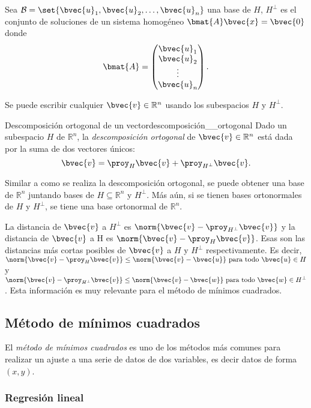 \documentclass{fmbnotes}
\begin{document}
Sea \(\mathcal{B}=\set{\bvec{u}_1,\bvec{u}_2,\ldots,\bvec{u}_n}\) una base de \(H\), \(H^\perp\) es el conjunto de soluciones de un sistema homogéneo \(\bmat{A}\bvec{x}=\bvec{0}\) donde \[\bmat{A}=\begin{pmatrix}
\bvec{u}_1 \\ \bvec{u}_2 \\ \vdots \\ \bvec{u}_n
\end{pmatrix}.\]

Se puede escribir cualquier \(\bvec{v}\in\mathbb{R}^{n}\) usando los subespacios \(H\) y \(H^\perp\).
\begin{teorema}{Descomposición ortogonal de un vector}{descomposición__ortogonal}
	Dado un subespacio \(H\) de \(\mathbb{R}^{n}\), la \emph{descomposición ortogonal} de \(\bvec{v}\in\mathbb{R}^{n}\) está dada por la suma de dos vectores únicos:
	\[\bvec{v}=\proy_H\bvec{v}+\proy_{H^\perp}\bvec{v}.\]
\end{teorema}

Similar a como se realiza la descomposición ortogonal, se puede obtener una base de \(\mathbb{R}^{n}\) juntando bases de \(H\subseteq\mathbb{R}^{n}\)
 y \(H^\perp\). Más aún, si se tienen bases ortonormales de \(H\) y \(H^\perp\), se tiene una base ortonormal de \(\mathbb{R}^{n}\).
 
La distancia de \( \bvec{v} \) a \( H^\perp \) es \( \norm{\bvec{v}-\proy_{H^\perp}\bvec{v}} \) y la distancia de \( \bvec{v} \) a H es \( \norm{\bvec{v}-\proy_{H}\bvec{v}} \). Esas son las distancias más cortas posibles de \(\bvec{v}\) a \(H\) y \(H^\perp\) respectivamente. Es decir, \( \norm{\bvec{v}-\proy_{H}\bvec{v}} \leq \norm{\bvec{v}-\bvec{u}} \text{ para todo } \bvec{u} \in H\) y \( \norm{\bvec{v}-\proy_{H^\perp}\bvec{v}}\leq \norm{\bvec{v}-\bvec{w}} \text{ para todo } \bvec{w} \in H^\perp \). Esta información es muy relevante para el método de mínimos cuadrados.

\subsection{Método de mínimos cuadrados}

El \emph{método de mínimos cuadrados} es uno de los métodos más comunes para realizar un ajuste a una serie de datos de dos variables, es decir datos de forma \((x,y)\). 

\subsubsection{Regresión lineal}
\end{document}

